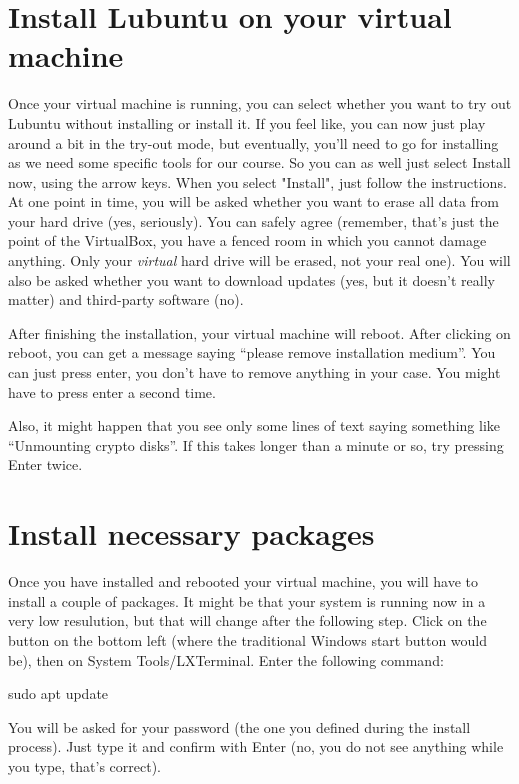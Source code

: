 \documentclass[a4paper,12pt]{book}
\begin{document}
\section{Install Lubuntu on your virtual machine}
Once your virtual machine is running, you can select whether you want to try out Lubuntu without installing or install it. If you feel like, you can now just play around a bit in the try-out mode, but eventually, you'll need to go for installing as we need some specific tools for our course. So you can as well just select Install now, using the arrow keys.
When you select "Install", just follow the instructions. At one point in time, you will be asked whether you want to erase all data from your hard drive (yes, seriously). You can safely agree (remember, that's just the point of the VirtualBox, you have a fenced room in which you cannot damage anything. Only your \emph{virtual} hard drive will be erased, not your real one). You will also be asked whether you want to download updates (yes, but it doesn't really matter) and third-party software (no).

After finishing the installation, your virtual machine will reboot. After clicking on reboot, you can get a message saying ``please remove installation medium''. You can just press enter, you don't have to remove anything in your case. You might have to press enter a second time.

Also, it might happen that you see only some lines of text saying something like ``Unmounting crypto disks''. If this takes longer than a minute or so, try pressing Enter twice. 



\section{Install necessary packages}
\label{sec:installpackages}
Once you have installed and rebooted your virtual machine, you will have to install a couple of packages. It might be that your system is running now in a very low resulution, but that will change after the following step.  Click on the button on the bottom left (where the traditional Windows start button would be), then on System Tools/LXTerminal. Enter the following command:

\begin{lstlistingbash}
sudo apt update
\end{lstlistingbash}
You will be asked for your password (the one you defined during the install process). Just type it and confirm with Enter (no, you do not see anything while you type, that's correct).
\end{document}
